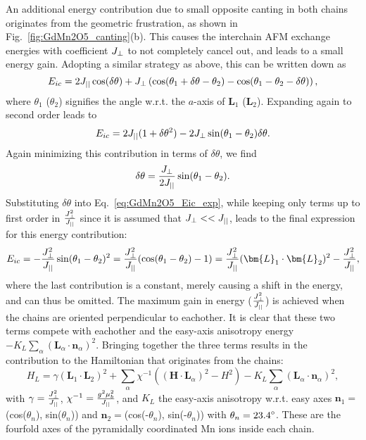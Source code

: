 An additional energy contribution due to small opposite canting in both chains originates from the geometric frustration, as shown in Fig.~\ref{fig:GdMn2O5_canting}(b). This causes the interchain AFM exchange energies with coefficient $J_{\perp}$ to not completely cancel out, and leads to a small energy gain.
Adopting a similar strategy as above, this can be written down as
\begin{equation}
	E_{ic} = 2 J_{||} \cos(\delta \theta) + J_{\perp} \left(\cos(\theta_1 + \delta \theta - \theta_2) - \cos(\theta_1 - \theta_2 -\delta \theta)\right),
\end{equation}
where $\theta_1$ ($\theta_2$) signifies the angle w.r.t. the $a$-axis of $\bm{L}_1$ ($\bm{L}_2$).
Expanding again to second order leads to
\begin{equation}
	E_{ic} = 2 J_{||} ( 1+ \delta \theta^2) - 2 J_{\perp} \sin(\theta_1 - \theta_2)\delta \theta. \label{eq:GdMn2O5_Eic_exp}
\end{equation}
Again minimizing this contribution in terms of $\delta \theta$, we find
\begin{equation}
	\delta \theta = \frac{J_{\perp}}{2 J_{||}} \sin(\theta_1 - \theta_2).
\end{equation}
Substituting $\delta \theta$ into Eq.~\ref{eq:GdMn2O5_Eic_exp}, while keeping only terms up to first order in $\frac{J_{\perp}^2}{J_{||}}$ since it is assumed that $J_{\perp} << J_{||}$, leads to the final expression for this energy contribution:
\begin{equation}
	E_{ic} = -\frac{\Jperp^2}{\Jpar}\sin(\theta_1 - \theta_2)^2 =  \frac{\Jperp^2}{\Jpar}(\cos(\theta_1 - \theta_2) - 1) = \frac{\Jperp^2}{\Jpar}(\bm{L}_1 \cdot \bm{L}_2)^2 - \frac{\Jperp^2}{\Jpar},
\end{equation}
where the last contribution is a constant, merely causing a shift in the energy, and can thus be omitted.
The maximum gain in energy ($\frac{J_{\perp}^2}{J_{||}}$) is achieved when the chains are oriented perpendicular to eachother.
It is clear that these two terms compete with eachother and the easy-axis anisotropy energy $-K_L\sum_\alpha(\bm{L}_\alpha\cdot \bm{n}_\alpha)^2$.
Bringing together the three terms results in the contribution to the Hamiltonian that originates from the chains:
\begin{equation}
	H_L = \gamma(\bm{L}_1\cdot \bm{L}_2)^2
    +\sum_{\alpha}\chi^{-1}((\bm{H}\cdot \bm{L}_\alpha)^2-H^2)
    -K_L\sum_\alpha(\bm{L}_\alpha\cdot \bm{n}_\alpha)^2\label{eq:GdMn2O5_hami_1},
\end{equation}
with $\gamma = \frac{J_{\perp}^2}{J_{||}}$, $\chi^{-1} = \frac{g^2\mu_b^2}{J_{||}}$, and $K_L$ the easy-axis anisotropy w.r.t. easy axes $\bm{n}_1=$(cos($\theta_n$), sin($\theta_n$)) and $\bm{n}_2=$(cos(-$\theta_n$), sin(-$\theta_n$)) with $\theta_n = \rm{23.4}^\circ$. These are the fourfold axes of the pyramidally coordinated Mn ions inside each chain.

